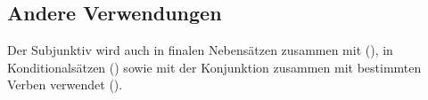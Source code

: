 
%
%
%


\subsection{Andere Verwendungen} Der Subjunktiv wird auch in finalen Nebensätzen zusammen mit  (), in Konditionalsätzen () sowie mit der Konjunktion  zusammen mit bestimmten Verben verwendet (). 

